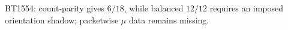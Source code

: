 \begin{center}\small
BT1554: count-parity gives $6/18$, while balanced $12/12$ requires an imposed orientation shadow; packetwise $\mu$ data remains missing.
\end{center}
